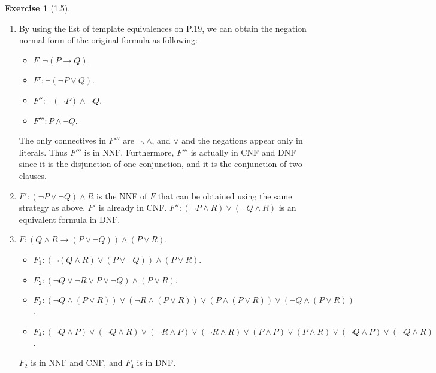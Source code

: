 \documentclass[12pt, psamsfonts]{amsart}
\theoremstyle{definition}
\newtheorem*{exer}{Exercise}
\theoremstyle{remark}
\numberwithin{equation}{subsection}
\begin{document}
\begin{exer}[1.5]
    $ $
    \begin{enumerate}[label=(\alph*)]
        \item
            By using the list of template equivalences on P.19, we can obtain the negation normal form of the original formula as following:
            \begin{itemize}
                \item
                    $F: \neg (P \rightarrow Q)$.
                \item
                    $F': \neg (\neg P \lor Q)$.
                \item
                    $F'': \neg (\neg P) \land \neg Q$.
                \item
                    $F''': P \land \neg Q$.
            \end{itemize}
            The only connectives in $F'''$ are $\neg, \land$, and $\lor$ and the negations appear only in literals.
            Thus $F'''$ is in NNF.
            Furthermore, $F'''$ is actually in CNF and DNF since it is the disjunction of one conjunction, and it is the conjunction of two clauses.
        \item
            $F': (\neg P \lor \neg Q) \land R$ is the NNF of $F$ that can be obtained using the same strategy as above.
            $F'$ is already in CNF.
            $F'': (\neg P \land R) \lor (\neg Q \land R)$ is an equivalent formula in DNF.
        \item
            $F:(Q \land R \rightarrow (P \lor \neg Q)) \land (P \lor R)$.
            \begin{itemize}
                \item
                    $F_1: (\neg (Q \land R) \lor (P \lor \neg Q)) \land (P \lor R)$.
                \item
                    $F_2: (\neg Q \lor \neg R \lor P \lor \neg Q) \land (P \lor R)$.
                \item
                    $F_3: (\neg Q \land (P \lor R)) \lor (\neg R \land (P \lor R)) \lor (P \land (P \lor R)) \lor (\neg Q \land (P \lor R))$.
                \item
                    $F_4: (\neg Q \land P) \lor (\neg Q \land R) \lor (\neg R \land P) \lor (\neg R \land R) \lor (P \land P) \lor (P \land R) \lor (\neg Q \land P) \lor (\neg Q \land R)$.
            \end{itemize}
            $F_2$ is in NNF and CNF, and $F_4$ is in DNF.
    \end{enumerate}
\end{exer}
\end{document}
